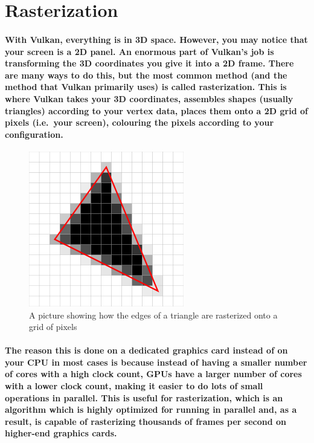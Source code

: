 \newpage
\section{\textsf{Rasterization}}\label{rasterization}

\paragraph{
With Vulkan, everything is in 3D space. However, you may notice that your screen is a 2D panel. An enormous part of Vulkan's job is transforming the 3D coordinates you give it into a 2D frame. There are many ways to do this, but the most common method (and the method that Vulkan primarily uses) is called rasterization. This is where Vulkan takes your 3D coordinates, assembles shapes (usually triangles) according to your vertex data, places them onto a 2D grid of pixels (i.e.~your screen), colouring the pixels according to your
configuration.
}

\begin{frame}{}
    \begin{figure}[ht]
        \centering
        \includegraphics{images/chap1/rasterization.png}
        \caption{A picture showing how the edges of a triangle are rasterized
        onto a grid of pixels}
    \end{figure}
\end{frame}
\paragraph{
The reason this is done on a dedicated graphics card instead of on your CPU in most cases is because instead of having a smaller number of cores with a high clock count, GPUs have a larger number of cores with a lower clock count, making it easier to do lots of small operations in parallel. This is useful for rasterization, which is an algorithm which is highly optimized for running in parallel and, as a result, is capable of rasterizing thousands of frames per second on higher-end graphics cards.
}